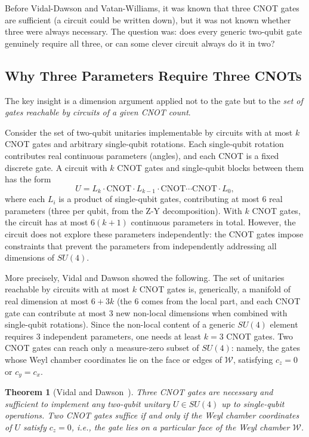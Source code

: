 \documentclass[12pt, a4paper, oneside]{report}
\theoremstyle{plain}
\newtheorem{theorem}{Theorem}[chapter]
\theoremstyle{definition}
\theoremstyle{remark}
\newcommand{\CNOT}{\mathrm{CNOT}}
\begin{document}
Before Vidal-Dawson and Vatan-Williams, it was known that three CNOT gates are sufficient
(a circuit could be written down), but it was not known whether three were always necessary.
The question was: does every generic two-qubit gate genuinely require all three, or can
some clever circuit always do it in two?

\subsection{Why Three Parameters Require Three CNOTs}

The key insight is a dimension argument applied not to the gate but to the \emph{set of
gates reachable by circuits of a given CNOT count}.

Consider the set of two-qubit unitaries implementable by circuits with at most $k$ CNOT
gates and arbitrary single-qubit rotations. Each single-qubit rotation contributes real
continuous parameters (angles), and each CNOT is a fixed discrete gate. A circuit with
$k$ CNOT gates and single-qubit blocks between them has the form
\[
  U = L_k \cdot \CNOT \cdot L_{k-1} \cdot \CNOT \cdots \CNOT \cdot L_0,
\]
where each $L_i$ is a product of single-qubit gates, contributing at most $6$ real parameters
(three per qubit, from the Z-Y decomposition). With $k$ CNOT gates, the circuit has at most
$6(k+1)$ continuous parameters in total. However, the circuit does not explore these
parameters independently: the CNOT gates impose constraints that prevent the parameters
from independently addressing all dimensions of $SU(4)$.

More precisely, Vidal and Dawson showed the following. The set of unitaries reachable by
circuits with at most $k$ CNOT gates is, generically, a manifold of real dimension at most
$6 + 3k$ (the 6 comes from the local part, and each CNOT gate can contribute at most 3
new non-local dimensions when combined with single-qubit rotations). Since the non-local
content of a generic $SU(4)$ element requires 3 independent parameters, one needs at least
$k = 3$ CNOT gates. Two CNOT gates can reach only a measure-zero subset of $SU(4)$: namely,
the gates whose Weyl chamber coordinates lie on the face or edges of $\mathcal{W}$, satisfying
$c_z = 0$ or $c_y = c_x$.

\begin{theorem}[Vidal and Dawson~\cite{vidal2004}]
\label{thm:vidal-dawson}
Three CNOT gates are necessary and sufficient to implement any two-qubit unitary
$U \in SU(4)$ up to single-qubit operations. Two CNOT gates suffice if and only if the
Weyl chamber coordinates of $U$ satisfy $c_z = 0$, i.e., the gate lies on a particular
face of the Weyl chamber $\mathcal{W}$.
\end{theorem}
\end{document}

